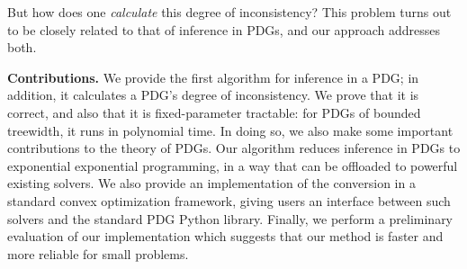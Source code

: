 {%
        But how {does} one \emph{calculate} this degree of inconsistency?
This problem turns out to be closely related to that of
    inference in PDGs, and our approach addresses both.
}



\textbf{Contributions.}
We provide the first algorithm for inference in a PDG;
in addition, it calculates a PDG's degree of inconsistency. 
We prove that it is correct, and also
that it is fixed-parameter tractable: for PDGs of bounded treewidth,
it runs in polynomial time.
In doing so, we also make some important contributions to the theory of PDGs.
Our algorithm reduces inference in PDGs to exponential exponential programming,
in a way that can be offloaded to powerful existing solvers.
We also provide an implementation of the conversion in a
standard convex optimization framework, giving users an
interface between such solvers and the standard PDG Python library.
Finally, we perform a preliminary evaluation of our implementation which suggests that our method is faster and more reliable for small problems.
%

